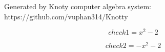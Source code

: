 \documentclass[letterpaper, 10pt]{extarticle}
\begin{document}
Generated by Knoty computer algebra system:
https://github.com/vuphan314/Knotty


\begin{dmath*}
check1 =
    x^{2} - 2
\end{dmath*}


\begin{dmath*}
check2 =
    - x^{2} - 2
\end{dmath*}
\end{document}
